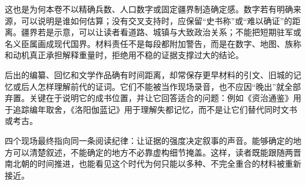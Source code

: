 这也是为何本卷不以精确兵数、人口数字或固定疆界制造确定感。数字若有明确来源，可以说明是谁如何估算；没有交叉支持时，应保留“史书称”或“难以确证”的距离。疆界若是示意，可以让读者看道路、城镇与大致政治关系；不能把短期驻军或名义臣属画成现代国界。材料责任不是每段都附加警告，而是在数字、地图、族称和动机真正承担解释重量时，拒绝用不稳的证据支撑过大的结论。

\begin{debate}[后出的材料是否一定较差]
后出的编纂、回忆和文学作品确有时间距离，却常保存更早材料的引文、旧城的记忆或后人怎样理解前代的证词。它们不能被当作现场录音，也不应因“晚出”就全部弃置。关键在于说明它的成书位置，并让它回答适合的问题：例如《资治通鉴》用于追踪编年取舍，《洛阳伽蓝记》用于理解失都记忆，而不是让它们替代同时文书或考古。
\end{debate}

四个现场最终指向同一条阅读纪律：让证据的强度决定叙事的声音。能够确定的地方可以清楚叙述，不能确定的地方不必靠虚构细节掩盖。这样，读者既能跟随两晋南北朝的时间推进，也能看见这个时代为何只能以多种、不完全重合的材料被重新接近。
